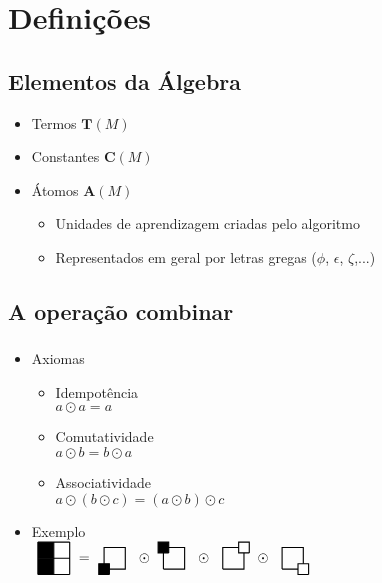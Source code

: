 \section{Definições}
\subsection{Elementos da Álgebra}
\begin{frame}{\subsecname}
\begin{itemize}
    \item<2-> Termos $\mathbf{T}(M)$\\\vspace{2 mm}
    \allTerms
    \item<3-> Constantes $\mathbf{C}(M)$ \\\vspace{2 mm}
    \allConstants
    \item<4-> Átomos $\mathbf{A}(M)$
    \begin{itemize}
        \item<4-> Unidades de aprendizagem criadas pelo algoritmo
        \item<5-> Representados em geral por letras gregas ($\phi$, $\epsilon$, $\zeta$,...)
    \end{itemize}
\end{itemize}
\end{frame}
\subsection{A operação combinar}
\begin{frame}
    \frametitle{\subsecname}
    \begin{itemize}
        \item<2-> Axiomas
        \begin{itemize}
            \item<2-> Idempotência\\
                \quad $a \odot a = a$
            \item<3-> Comutatividade\\
                \quad $a \odot b = b \odot a$
            \item<4-> Associatividade\\
                \quad $a \odot (b \odot c) = (a \odot b) \odot c$
        \end{itemize}
        \item<5-> Exemplo\\\vspace{2 mm}
        {\renewcommand*{\TermScale}{0.4}
    $
        \vcenter{\hbox{\BBWW}}
        =
        \vcenter{\hbox{\constant{1/3/black}}}
        \odot
        \vcenter{\hbox{\constant{1/1/black}}}
        \odot
        \vcenter{\hbox{\constant{3/1/white}}}
        \odot
        \vcenter{\hbox{\constant{3/3/white}}}
    $}
    \end{itemize}
\end{frame}